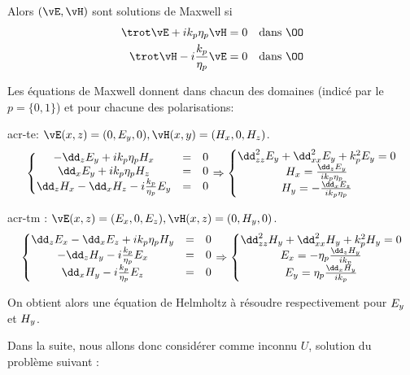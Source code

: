 Alors \((\vE,\vH)\) sont solutions de Maxwell si
\begin{align}
\label{eq:coeffs_ref:maxwell-E}
\trot \vE + i k_p \eta_p \vH &= 0 && \text{dans \(\OO\)}\\
\label{eq:coeffs_ref:maxwell-H}
\trot \vH - i \frac{k_p}{\eta_p} \vE &= 0 && \text{dans \(\OO\)}
\end{align}

Les équations de Maxwell donnent dans chacun des domaines (indicé par le \(p = \lbrace0,1\rbrace\)) et pour chacune des polarisations:

\Gls{acr-te}: \( \vE(\x,\z) = (0,E_y,0), \vH(\x,\y) = (H_x,0,H_z)\).
\[
\left\lbrace
\begin{matrix}
-\dd_{\z} E_\y + i k_p \eta_p H_\x & = & 0 \\
\dd_{\x} E_\y + i k_p \eta_p H_\z &= & 0 \\
\dd_{\z} H_\x- \dd_{\x} H_\z - i\frac{k_p}{\eta_p} E_\y & = & 0\\
\end{matrix}
\right.
\Rightarrow
\left\lbrace
\begin{matrix}
\dd_{\z\z}^2 E_\y + \dd_{\x\x}^2 E_\y + k_p^2 E_\y = 0\\
H_\x = \frac{\dd_{\z} E_\y}{i k_p \eta_p }\\
H_\y =  -\frac{\dd_{\x} E_\z}{i k_p \eta_p }
\end{matrix}
\right.
\]

\Gls{acr-tm} : \( \vE(\x,\z) = (E_\x,0,E_\z), \vH(\x,\z) = (0,H_\y,0)\).
\[
\left\lbrace
\begin{matrix}
\dd_{\z} E_\x - \dd_{\x} E_\z + i k_p \eta_p  H_\y &= & 0 \\
- \dd_{\z} H_\y - i\frac{k_p}{\eta_p} E_\x & = & 0\\
\dd_{\x} H_\y -i\frac{k_p}{\eta_p} E_\z &=&0\\
\end{matrix}
\right.
\Rightarrow
\left\lbrace
\begin{matrix}
\dd_{\z\z}^2 H_\y + \dd_{\x\x}^2 H_\y + k_p^2 H_\y = 0\\
E_\x = -\eta_p\frac{\dd_{\z} H_\y}{i k_p}\\
E_\y = \eta_p\frac{\dd_{\x} H_\y}{i k_p}
\end{matrix}
\right.
\]

On obtient alors une équation de Helmholtz à résoudre respectivement pour \(E_{y}\) et \(H_{y}\).

Dans la suite, nous allons donc considérer comme inconnu \(U\), solution du problème suivant :

